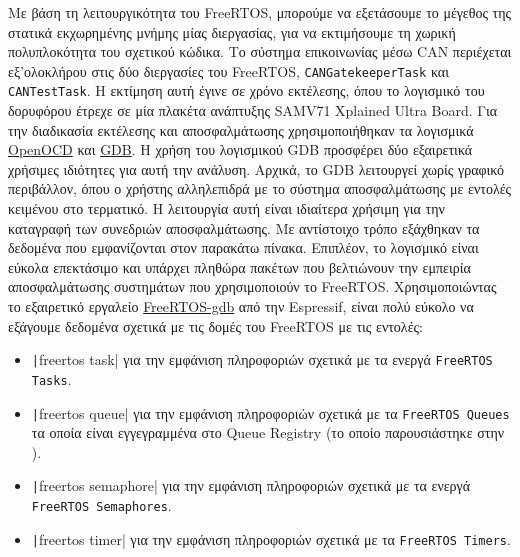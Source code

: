 \documentclass[a4paper,nobib,justified]{tufte-book}
\begin{document}
Με βάση τη λειτουργικότητα του FreeRTOS, μπορούμε να εξετάσουμε το μέγεθος της στατικά εκχωρημένης μνήμης μίας διεργασίας, για να εκτιμήσουμε τη χωρική πολυπλοκότητα του σχετικού κώδικα. Το σύστημα επικοινωνίας μέσω CAN περιέχεται εξ'ολοκλήρου στις δύο διεργασίες του FreeRTOS, \texttt{CANGatekeeperTask} και \texttt{CANTestTask}. Η εκτίμηση αυτή έγινε σε χρόνο εκτέλεσης, όπου το λογισμικό του δορυφόρου έτρεχε σε μία πλακέτα ανάπτυξης SAMV71 Xplained Ultra Board. Για την διαδικασία εκτέλεσης και αποσφαλμάτωσης χρησιμοποιήθηκαν τα λογισμικά \href{https://openocd.org/}{OpenOCD} και \href{https://www.gnu.org/savannah-checkouts/gnu/gdb/index.html}{GDB}. Η χρήση του λογισμικού GDB προσφέρει δύο εξαιρετικά χρήσιμες ιδιότητες για αυτή την ανάλυση. Αρχικά, το GDB λειτουργεί χωρίς γραφικό περιβάλλον, όπου ο χρήστης αλληλεπιδρά με το σύστημα αποσφαλμάτωσης με εντολές κειμένου στο τερματικό. Η λειτουργία αυτή είναι ιδιαίτερα χρήσιμη για την καταγραφή των συνεδριών αποσφαλμάτωσης. Με αντίστοιχο τρόπο εξάχθηκαν τα δεδομένα που εμφανίζονται στον παρακάτω πίνακα. Επιπλέον, το λογισμικό είναι εύκολα επεκτάσιμο και υπάρχει πληθώρα πακέτων που βελτιώνουν την εμπειρία αποσφαλμάτωσης συστημάτων που χρησιμοποιούν το FreeRTOS. Χρησιμοποιώντας το εξαιρετικό εργαλείο \href{https://github.com/espressif/freertos-gdb}{FreeRTOS-gdb} από την Espressif, είναι πολύ εύκολο να εξάγουμε δεδομένα σχετικά με τις δομές του FreeRTOS με τις εντολές:


\begin{itemize}
	\item \texttt|freertos task| για την εμφάνιση πληροφοριών σχετικά με τα ενεργά \texttt{FreeRTOS Tasks}.
	\item \texttt|freertos queue| για την εμφάνιση πληροφοριών σχετικά με τα \texttt{FreeRTOS Queues} τα οποία είναι εγγεγραμμένα στο Queue Registry (το οποίο παρουσιάστηκε στην ).
	\item \texttt|freertos semaphore| για την εμφάνιση πληροφοριών σχετικά με τα ενεργά \texttt{FreeRTOS Semaphores}.
	\item \texttt|freertos timer| για την εμφάνιση πληροφοριών σχετικά με τα \texttt{FreeRTOS Timers}.
\end{itemize}
\end{document}
